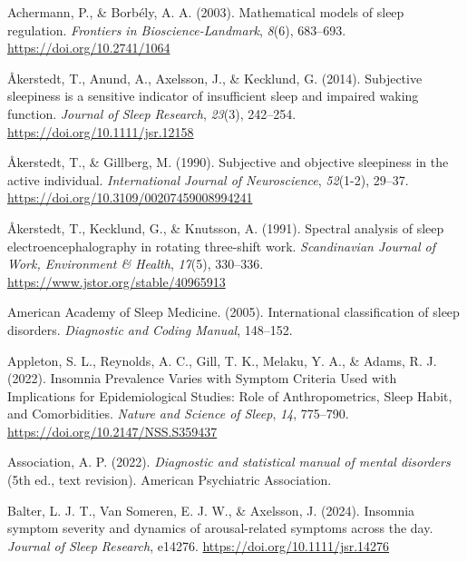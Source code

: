 \documentclass[
]{article}
\newlength{\cslhangindent}
\newenvironment{CSLReferences}[2] %
 {\begin{list}{}{%
  \setlength{\itemindent}{0pt}
  \setlength{\leftmargin}{0pt}
  \setlength{\parsep}{0pt}
  \ifodd #1
   \setlength{\leftmargin}{\cslhangindent}
   \setlength{\itemindent}{-1\cslhangindent}
  \fi
  \setlength{\itemsep}{#2\baselineskip}}}
 {\end{list}}
\begin{document}
\label{refs}
\begin{CSLReferences}{1}{0}
Achermann, P., \& Borbély, A. A. (2003). Mathematical models of sleep
regulation. \emph{Frontiers in Bioscience-Landmark}, \emph{8}(6),
683--693. \url{https://doi.org/10.2741/1064}

Åkerstedt, T., Anund, A., Axelsson, J., \& Kecklund, G. (2014).
Subjective sleepiness is a sensitive indicator of insufficient sleep and
impaired waking function. \emph{Journal of Sleep Research},
\emph{23}(3), 242--254. \url{https://doi.org/10.1111/jsr.12158}

Åkerstedt, T., \& Gillberg, M. (1990). Subjective and objective
sleepiness in the active individual. \emph{International Journal of
Neuroscience}, \emph{52}(1-2), 29--37.
\url{https://doi.org/10.3109/00207459008994241}

Åkerstedt, T., Kecklund, G., \& Knutsson, A. (1991). Spectral analysis
of sleep electroencephalography in rotating three-shift work.
\emph{Scandinavian Journal of Work, Environment \& Health},
\emph{17}(5), 330--336. \url{https://www.jstor.org/stable/40965913}

American Academy of Sleep Medicine. (2005). International classification
of sleep disorders. \emph{Diagnostic and Coding Manual}, 148--152.

Appleton, S. L., Reynolds, A. C., Gill, T. K., Melaku, Y. A., \& Adams,
R. J. (2022). Insomnia {Prevalence Varies} with {Symptom Criteria Used}
with {Implications} for {Epidemiological Studies}: {Role} of
{Anthropometrics}, {Sleep Habit}, and {Comorbidities}. \emph{Nature and
Science of Sleep}, \emph{14}, 775--790.
\url{https://doi.org/10.2147/NSS.S359437}

Association, A. P. (2022). \emph{Diagnostic and statistical manual of
mental disorders} (5th ed., text revision). American Psychiatric
Association.

Balter, L. J. T., Van Someren, E. J. W., \& Axelsson, J. (2024).
Insomnia symptom severity and dynamics of arousal-related symptoms
across the day. \emph{Journal of Sleep Research}, e14276.
\url{https://doi.org/10.1111/jsr.14276}


\end{CSLReferences}
\end{document}
